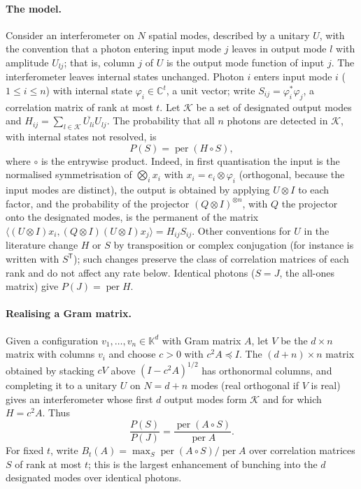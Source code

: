 \documentclass[11pt,a4paper]{article}
\theoremstyle{remark}
\newcommand{\per}{\operatorname{per}}
\newcommand{\C}{\mathbb C}
\newcommand{\K}{\mathbb K}
\begin{document}
\paragraph{The model.}
Consider an interferometer on $N$ spatial modes, described by a unitary $U$, with the convention that a photon entering input mode $j$ leaves in output mode $l$ with amplitude $U_{lj}$; that is, column $j$ of $U$ is the output mode function of input $j$. The interferometer leaves internal states unchanged. Photon $i$ enters input mode $i$ ($1\le i\le n$) with internal state $\varphi_i\in\C^t$, a unit vector; write $S_{ij}=\varphi_i^*\varphi_j$, a correlation matrix of rank at most $t$. Let $\mathcal K$ be a set of designated output modes and $H_{ij}=\sum_{l\in\mathcal K}\overline{U_{li}}U_{lj}$. The probability that all $n$ photons are detected in $\mathcal K$, with internal states not resolved, is
\begin{equation}\label{eq:bunching}
 P(S)=\per(H\circ S),
\end{equation}
where $\circ$ is the entrywise product. Indeed, in first quantisation the input is the normalised symmetrisation of $\bigotimes_ix_i$ with $x_i=e_i\otimes\varphi_i$ (orthogonal, because the input modes are distinct), the output is obtained by applying $U\otimes I$ to each factor, and the probability of the projector $(Q\otimes I)^{\otimes n}$, with $Q$ the projector onto the designated modes, is the permanent of the matrix $\langle (U\otimes I)x_i,(Q\otimes I)(U\otimes I)x_j\rangle=H_{ij}S_{ij}$. Other conventions for $U$ in the literature change $H$ or $S$ by transposition or complex conjugation (for instance \cite[Eq.~(4)]{SNC} is written with $S^{\mathsf T}$); such changes preserve the class of correlation matrices of each rank and do not affect any rate below. Identical photons ($S=J$, the all-ones matrix) give $P(J)=\per H$.

\paragraph{Realising a Gram matrix.}
Given a configuration $v_1,\dots,v_n\in\K^d$ with Gram matrix $A$, let $V$ be the $d\times n$ matrix with columns $v_i$ and choose $c>0$ with $c^2A\preceq I$. The $(d+n)\times n$ matrix obtained by stacking $cV$ above $(I-c^2A)^{1/2}$ has orthonormal columns, and completing it to a unitary $U$ on $N=d+n$ modes (real orthogonal if $V$ is real) gives an interferometer whose first $d$ output modes form $\mathcal K$ and for which $H=c^2A$. Thus
\[
\frac{P(S)}{P(J)}=\frac{\per(A\circ S)}{\per A}.
\]
For fixed $t$, write $B_t(A)=\max_S\per(A\circ S)/\per A$ over correlation matrices $S$ of rank at most $t$; this is the largest enhancement of bunching into the $d$ designated modes over identical photons.
\end{document}
